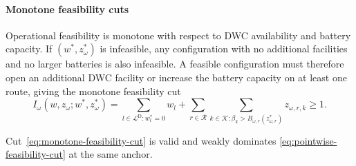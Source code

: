 \paragraph{Monotone feasibility cuts}
Operational feasibility is monotone with respect to DWC availability and battery capacity.
If $(w^*,z_\omega^*)$ is infeasible, any configuration with no additional facilities and no larger batteries is also infeasible.
A feasible configuration must therefore open an additional DWC facility or increase the battery capacity on at least one route, giving the monotone feasibility cut
\begin{equation}
 I_\omega(w,z_\omega;w^*,z_\omega^*)=
 \sum_{l\in\mathcal L^{\mathrm D}:w_l^*=0}w_l
 +\sum_{r\in\mathcal R}\sum_{k\in\mathcal K:\beta_k>B_{\omega,r}(z_{\omega,r}^*)}z_{\omega,r,k}\ge1.
\label{eq:monotone-feasibility-cut}
\end{equation}
\begin{proposition}
\label{prop:monotone-feasibility-cut}
Cut~\eqref{eq:monotone-feasibility-cut} is valid and weakly dominates \eqref{eq:pointwise-feasibility-cut} at the same anchor.
\end{proposition}
